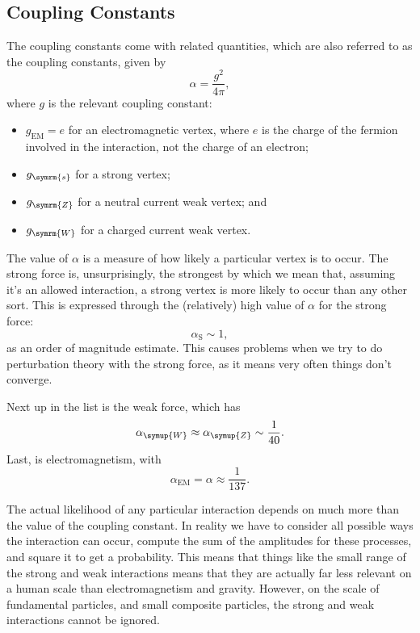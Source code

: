 \documentclass[fleqn]{NotesClass}
\newcommand{\Pparticle}[1]{\symup{#1}}
\newcommand{\PZ}{\ensuremath{\Pparticle{Z}}}
\newcommand{\PW}{\ensuremath{\Pparticle{W}}}
\newcommand{\strongCoupling}{g_{\symrm{s}}}
\newcommand{\wCoupling}{g_{\symrm{W}}}
\newcommand{\zCoupling}{g_{\symrm{Z}}}
\newcommand{\EM}{\text{EM}}
\newcommand{\strongForce}{\text{S}}
\begin{document}
    \subsection{Coupling Constants}
    The coupling constants come with related quantities, which are also referred to as the coupling constants, given by
    \begin{equation}
        \alpha = \frac{g^2}{4\pi},
    \end{equation}
    where \(g\) is the relevant coupling constant:
    \begin{itemize}
        \item \(g_{\EM} = e\) for an electromagnetic vertex, where \(e\) is the charge of the fermion involved in the interaction, not the charge of an electron;
        \item \(\strongCoupling\) for a strong vertex;
        \item \(\zCoupling\) for a neutral current weak vertex; and
        \item \(\wCoupling\) for a charged current weak vertex.
    \end{itemize}
    
    The value of \(\alpha\) is a measure of how likely a particular vertex is to occur.
    The strong force is, unsurprisingly, the strongest by which we mean that, assuming it's an allowed interaction, a strong vertex is more likely to occur than any other sort.
    This is expressed through the (relatively) high value of \(\alpha\) for the strong force:
    \begin{equation}
        \alpha_{\strongForce} \sim 1,
    \end{equation}
    as an order of magnitude estimate.
    This causes problems when we try to do perturbation theory with the strong force, as it means very often things don't converge.
    
    Next up in the list is the weak force, which has
    \begin{equation}
        \alpha_{\PW} \approx \alpha_{\PZ} \sim \frac{1}{40}.
    \end{equation}
    Last, is electromagnetism, with
    \begin{equation}
        \alpha_{\EM} = \alpha \approx \frac{1}{137}.
    \end{equation}
    
    The actual likelihood of any particular interaction depends on much more than the value of the coupling constant.
    In reality we have to consider all possible ways the interaction can occur, compute the sum of the amplitudes for these processes, and square it to get a probability.
    This means that things like the small range of the strong and weak interactions means that they are actually far less relevant on a human scale than electromagnetism and gravity.
    However, on the scale of fundamental particles, and small composite particles, the strong and weak interactions cannot be ignored.
    
\end{document}
